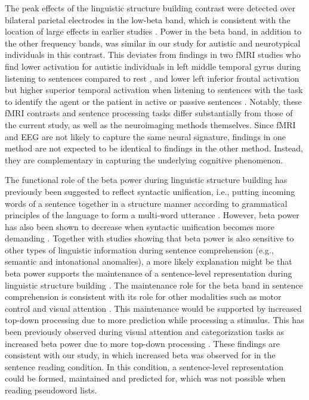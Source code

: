 The peak effects of the linguistic structure building contrast were detected over bilateral parietal electrodes in the low-beta band, which is consistent with the location of large effects in earlier studies \citep{bastiaansen2010,bastiaansen2015}. Power in the beta band, in addition to the other frequency bands, was similar in our study for autistic and neurotypical individuals in this contrast. This deviates from findings in two fMRI studies who find lower activation for autistic individuals in left middle temporal gyrus during listening to sentences compared to rest \citep{muller1999}, and lower left inferior frontal activation but higher superior temporal activation when listening to sentences with the task to identify the agent or the patient in active or passive sentences \citep{just2004}. Notably, these fMRI contrasts and sentence processing tasks differ substantially from those of the current study, as well as the neuroimaging methods themselves. Since fMRI and EEG are not likely to capture the same neural signature, findings in one method are not expected to be identical to findings in the other method. Instead, they are complementary in capturing the underlying cognitive phenomenon.

The functional role of the beta power during linguistic structure building has previously been suggested to reflect syntactic unification, i.e., putting incoming words of a sentence together in a structure manner according to grammatical principles of the language to form a multi-word utterance \citep{bastiaansen2010,bastiaansen2015}. However, beta power has also been shown to decrease when syntactic unification becomes more demanding \citep{lewis2023}. Together with studies showing that beta power is also sensitive to other types of linguistic information during sentence comprehension (e.g., semantic and intonational anomalies), a more likely explanation might be that beta power supports the maintenance of a sentence-level representation during linguistic structure building \citep{lewis2016}. The maintenance role for the beta band in sentence comprehension is consistent with its role for other modalities such as motor control and visual attention \citep{engel2010}. This maintenance would be supported by increased top-down processing due to more prediction while processing a stimulus. This has been previously observed during visual attention and categorization tasks as increased beta power due to more top-down processing \citep{limanowski2020,antzoulatos2016}. These findings are consistent with our study, in which increased beta was observed for in the sentence reading condition. In this condition, a sentence-level representation could be formed, maintained and predicted for, which was not possible when reading pseudoword lists. 

